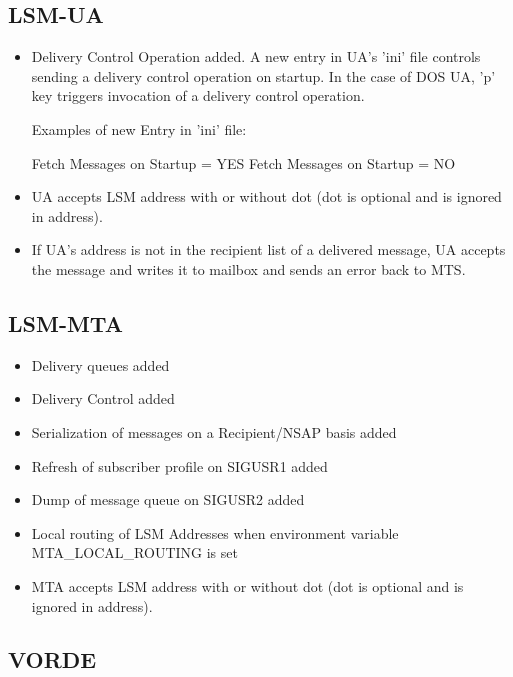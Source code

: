 \subsection*{LSM-UA}
\begin{itemize}
\item Delivery Control Operation added. A new entry in UA's 'ini' file controls
sending a delivery control operation on startup.
In the case of DOS UA, 'p' key triggers invocation of a delivery control
operation.

Examples of new Entry in 'ini' file: 

        Fetch Messages on Startup = YES
        Fetch Messages on Startup = NO
\end{itemize}

\begin{itemize}
\item UA accepts LSM address with or without dot (dot is optional and is ignored 
in address).
\end{itemize}

\begin{itemize}
\item If UA's address is not in the recipient list of a delivered message, UA
accepts the message and writes it to mailbox and sends an error back to
MTS.
\end{itemize}

\subsection*{LSM-MTA}

\begin{itemize}
\item Delivery queues added
\item Delivery Control added
\item Serialization of messages on a Recipient/NSAP basis added
\item Refresh of subscriber profile on SIGUSR1 added
\item Dump of message queue on SIGUSR2 added
\item Local routing of LSM Addresses when environment variable MTA\_LOCAL\_ROUTING is set
\item MTA accepts LSM address with or without dot (dot is optional and is ignored 
in address).
\end{itemize}

\subsection*{VORDE}

